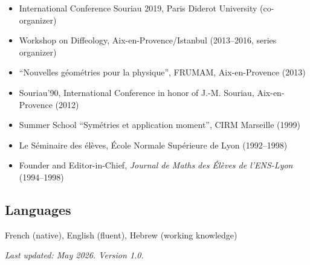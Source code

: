 \documentclass[11pt,reqno]{amsart}
\begin{document}
  \begin{itemize}
    \item International Conference Souriau 2019, Paris Diderot University (co-organizer)
    \item Workshop on Diffeology, Aix-en-Provence/Istanbul (2013–2016, series organizer)
    \item ``Nouvelles géométries pour la physique'', FRUMAM, Aix-en-Provence (2013)
    \item Souriau'90, International Conference in honor of J.-M. Souriau, Aix-en-Provence (2012)
    \item Summer School ``Symétries et application moment'', CIRM Marseille (1999)
    \item Le Séminaire des élèves, École Normale Supérieure de Lyon (1992–1998)
    \item Founder and Editor-in-Chief, \emph{Journal de Maths des Élèves de l'ENS-Lyon} (1994–1998)
  \end{itemize}
  
  \subsection*{Languages}
  
  French (native), English (fluent), Hebrew (working knowledge)
  
  \vfill
  \noindent\textit{Last updated: May 2026. Version 1.0.}
  
\end{document}

